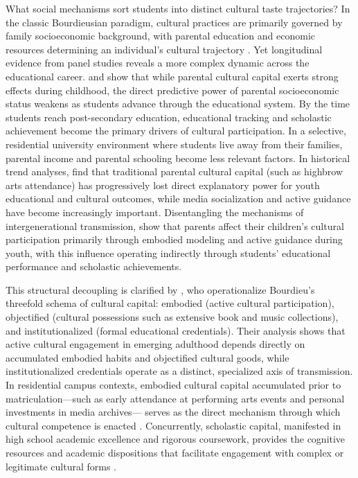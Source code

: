 \documentclass[12pt]{article}
\begin{document}
What social mechanisms sort students into distinct cultural taste trajectories? In the classic Bourdieusian paradigm, cultural practices are primarily governed by family socioeconomic background, with parental education and economic resources determining an individual's cultural trajectory \citep{bourdieu1984distinction,willekens2014family}. Yet longitudinal evidence from panel studies reveals a more complex dynamic across the educational career. \citet{nagel2002participation} and \citet{nagel2010cultural} show that while parental cultural capital exerts strong effects during childhood, the direct predictive power of parental socioeconomic status weakens as students advance through the educational system. By the time students reach post-secondary education, educational tracking and scholastic achievement become the primary drivers of cultural participation. In a selective, residential university environment where students live away from their families, parental income and parental schooling become less relevant factors. In historical trend analyses, \citet{kraaykamp2016parental} find that traditional parental cultural capital (such as highbrow arts attendance) has progressively lost direct explanatory power for youth educational and cultural outcomes, while media socialization and active guidance have become increasingly important. Disentangling the mechanisms of intergenerational transmission, \citet{vanhek2015how} show that parents affect their children's cultural participation primarily through embodied modeling and active guidance during youth, with this influence operating indirectly through students' educational performance and scholastic achievements.

This structural decoupling is clarified by \citet{kraaykamp2010intergenerational}, who operationalize Bourdieu's threefold schema of cultural capital: embodied (active cultural participation), objectified (cultural possessions such as extensive book and music collections), and institutionalized (formal educational credentials). Their analysis shows that active cultural engagement in emerging adulthood depends directly on accumulated embodied habits and objectified cultural goods, while institutionalized credentials operate as a distinct, specialized axis of transmission. In residential campus contexts, embodied cultural capital accumulated prior to matriculation---such as early attendance at performing arts events and personal investments in media archives--- serves as the direct mechanism through which cultural competence is enacted \citep{willekens2014family,spacek2017measuring}. Concurrently, scholastic capital, manifested in high school academic excellence and rigorous coursework, provides the cognitive resources and academic dispositions that facilitate engagement with complex or legitimate cultural forms \citep{nagel2002participation, wang2025cultural}.
\end{document}
